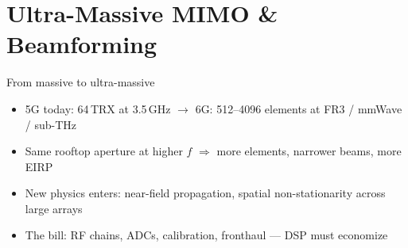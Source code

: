 \section{Ultra-Massive MIMO \& Beamforming}

\begin{frame}{From massive to ultra-massive}
  \begin{itemize}\itemsep2pt
    \item 5G today: 64\,TRX at 3.5\,GHz \;$\to$\; 6G: \alert{512--4096
          elements} at FR3 / mmWave / sub-THz
    \item Same rooftop aperture at higher $f$ $\Rightarrow$ more elements,
          narrower beams, more EIRP
    \item New physics enters: \alert{near-field propagation}, spatial
          non-stationarity across large arrays
    \item The bill: RF chains, ADCs, calibration, fronthaul --- DSP must
          economize
  \end{itemize}
\end{frame}

